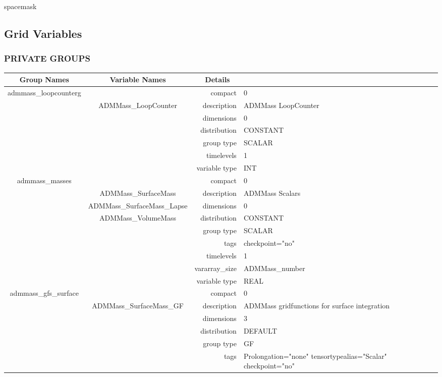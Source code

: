 spacemask
\vspace{2mm}
\subsection*{Grid Variables}
\vspace{5mm}\subsubsection{PRIVATE GROUPS}

\vspace{5mm}

\begin{tabular*}{150mm}{|c|c@{\extracolsep{\fill}}|rl|} \hline 
~ {\bf Group Names} ~ & ~ {\bf Variable Names} ~  &{\bf Details} ~ & ~\\ 
\hline 
admmass\_loopcounterg &  & compact & 0 \\ 
 & ADMMass\_LoopCounter & description & ADMMass LoopCounter \\ 
 &  & dimensions & 0 \\ 
 &  & distribution & CONSTANT \\ 
 &  & group type & SCALAR \\ 
 &  & timelevels & 1 \\ 
 &  & variable type & INT \\ 
\hline 
admmass\_masses &  & compact & 0 \\ 
 & ADMMass\_SurfaceMass & description & ADMMass Scalars \\ 
 & ADMMass\_SurfaceMass\_Lapse & dimensions & 0 \\ 
 & ADMMass\_VolumeMass & distribution & CONSTANT \\ 
 &  & group type & SCALAR \\ 
 &  & tags & checkpoint="no" \\ 
 &  & timelevels & 1 \\ 
 &  & vararray\_size & ADMMass\_number \\ 
 &  & variable type & REAL \\ 
\hline 
admmass\_gfs\_surface &  & compact & 0 \\ 
 & ADMMass\_SurfaceMass\_GF & description & ADMMass gridfunctions for surface integration \\ 
 &  & dimensions & 3 \\ 
 &  & distribution & DEFAULT \\ 
 &  & group type & GF \\ 
 &  & tags & Prolongation="none" tensortypealias="Scalar" checkpoint="no" \\ 

\end{tabular*}
